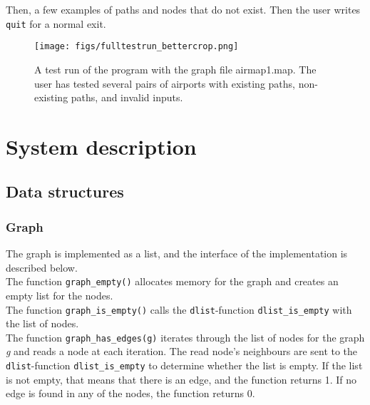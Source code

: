 \documentclass{article}
\begin{document}
Then, a few examples of paths and nodes that do not exist. Then the user writes \texttt{quit} for a normal exit.  
\begin{figure}[H]
    \centering
    \texttt{[image: figs/fulltestrun\_bettercrop.png]}
    \caption{A test run of the program with the graph file airmap1.map. The user has tested several pairs of airports with existing paths, non-existing paths, and invalid inputs. }
    \label{fig:testrun}
\end{figure}



\section{System description}
\label{sec:system_description}
\subsection{Data structures}
\label{sec:org6e002c6}
\subsubsection{Graph}
\label{sec:graph}
The graph is implemented as a list, and the interface of the implementation is described below.         \\

\noindent
The function \texttt{graph\_empty()} allocates memory for the graph and creates an empty list for the nodes. \\

\noindent
The function \texttt{graph\_is\_empty()} calls the \texttt{dlist}-function \texttt{dlist\_is\_empty} with the list of nodes.\\

\noindent
The function \texttt{graph\_has\_edges(g)} iterates through the list of nodes for the graph \textit{g} and reads a node at each iteration. The read node's neighbours are sent to the \texttt{dlist}-function \texttt{dlist\_is\_empty} to determine whether the list is empty. If the list is not empty, that means that there is an edge, and the function returns 1. If no edge is found in any of the nodes, the function returns 0.\\
\end{document}
